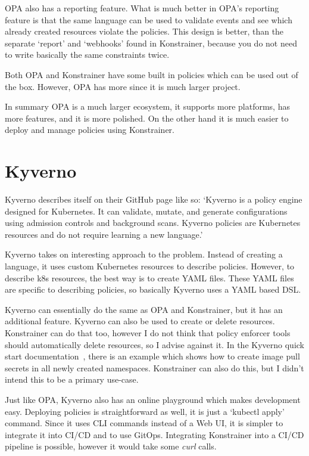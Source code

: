 OPA also has a reporting feature. What is much better in OPA's reporting feature is that the same language can be used to validate events and see which already created resources violate the policies. This design is better, than the separate `report' and `webhooks' found in Konstrainer, because you do not need to write basically the same constraints twice.

Both OPA and Konstrainer have some built in policies which can be used out of the box. However, OPA has more since it is much larger project.

In summary OPA is a much larger ecosystem, it supports more platforms, has more features, and it is more polished. On the other hand it is much easier to deploy and manage policies using Konstrainer.

\section{Kyverno}

Kyverno describes itself on their GitHub page like so:
`Kyverno is a policy engine designed for Kubernetes. It can validate, mutate, and generate configurations using admission controls and background scans. Kyverno policies are Kubernetes resources and do not require learning a new language.'~\cite{Kyverno}

Kyverno takes on interesting approach to the problem. Instead of creating a language, it uses custom Kubernetes resources to describe policies. However, to describe k8s resources, the best way is to create YAML files. These YAML files are specific to describing policies, so basically Kyverno uses a YAML based DSL.

Kyverno can essentially do the same as OPA and Konstrainer, but it has an additional feature. Kyverno can also be used to create or delete resources. Konstrainer can do that too, however I do not think that policy enforcer tools should automatically delete resources, so I advise against it. In the Kyverno quick start documentation~\cite{KyvernoQuick}, there is an example which shows how to create image pull secrets in all newly created namespaces. Konstrainer can also do this, but I didn't intend this to be a primary use-case.

Just like OPA, Kyverno also has an online playground which makes development easy. Deploying policies is straightforward as well, it is just a `kubectl apply' command. Since it uses CLI commands instead of a Web UI, it is simpler to integrate it into CI/CD and to use GitOps. Integrating Konstrainer into a CI/CD pipeline is possible, however it would take some \emph{curl} calls.

